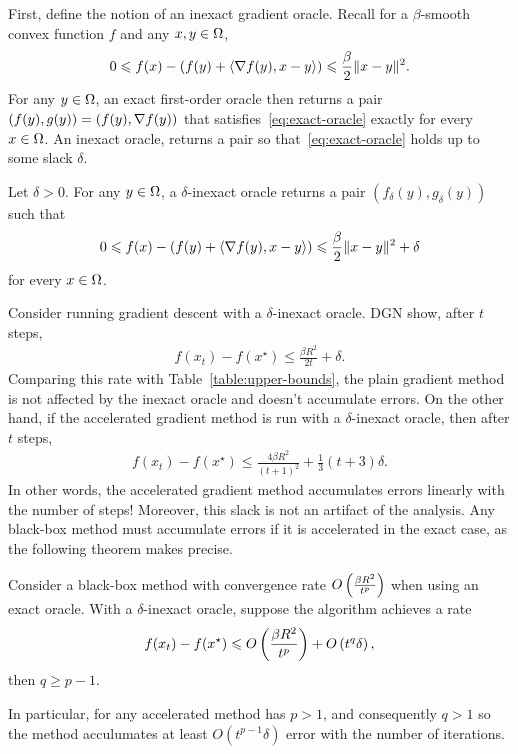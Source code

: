 First, define the notion of an inexact gradient oracle. Recall for a
$\beta$-smooth convex function $f$ and any $x, y \in \Omega$,
\begin{align}
    0 \leqslant f(x)  - \left(f(y) + \langle \nabla f(y), x - y \rangle \right )
    \leqslant \frac{\beta}{2} \lVert x-y\rVert^2. \label{eq:exact-oracle}
\end{align}
For any $y \in \Omega$, an exact first-order oracle then returns a pair
$(f(y), g(y)) = (f(y), \nabla f(y))$ that satisfies~\eqref{eq:exact-oracle}
exactly for every $x \in \Omega$. 
An inexact oracle, returns a pair so that~\eqref{eq:exact-oracle} holds up to some
slack $\delta$.
~
\begin{definition}
Let $\delta > 0$. For any $y\in \Omega$, a $\delta$-inexact oracle returns a pair
$(f_\delta(y), g_\delta(y))$ such that
\begin{align*}
    0 \leqslant f(x)  - \left(f(y) + \langle \nabla f(y), x - y \rangle \right )
    \leqslant \frac{\beta}{2} \lVert x-y\rVert^2 + \delta
\end{align*}
for every $x \in \Omega$.
\end{definition}
Consider running gradient descent with a $\delta$-inexact oracle.
DGN \cite{devolder2014first} show, after $t$ steps,
\begin{align*}
    f(x_t) - f(x^\star) \leq \frac{\beta R^2}{2t} + \delta.
\end{align*}
Comparing this rate with Table~\eqref{table:upper-bounds}, the plain gradient
method is not affected by the inexact oracle and doesn't accumulate errors. 
On the other hand, if the accelerated gradient
method is run with a $\delta$-inexact oracle, then after $t$ steps,
\begin{align*}
    f(x_t) - f(x^\star)  \leq \frac{4 \beta R^2}{(t+1)^2} +
    \frac{1}{3}(t+3)\delta.
\end{align*}
In other words, the accelerated gradient method accumulates errors linearly with
the number of steps! Moreover, this slack is not an artifact of the analysis.
Any black-box method must accumulate errors if it is accelerated in the exact
case, as the following theorem makes precise.
\begin{theorem}
Consider a black-box method with convergence rate $O\left(\frac{\beta R^2}{t^p} \right )$
when using an exact oracle. With a $\delta$-inexact oracle, suppose the
algorithm achieves a rate
\begin{align}
    f(x_t) - f(x^\star) \leqslant O\left(\frac{\beta R^2}{t^p} \right ) + O\left(t^q \delta \right ),
\end{align}
then $q \geq p-1$.
\end{theorem}
In particular, for any accelerated method has $p > 1$, and consequently $q > 1$
so the method acculumates at least $O(t^{p-1} \delta)$ error with the number of
iterations. 
